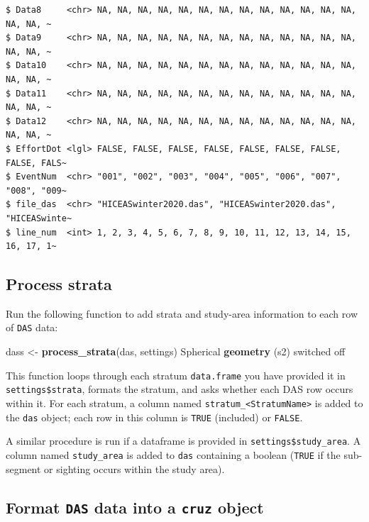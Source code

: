 \documentclass[
]{book}
\newenvironment{Shaded}{\begin{snugshade}}{\end{snugshade}}
\newcommand{\KeywordTok}[1]{\textcolor[rgb]{0.13,0.29,0.53}{\textbf{#1}}}
\newcommand{\NormalTok}[1]{#1}
\newcommand{\StringTok}[1]{\textcolor[rgb]{0.31,0.60,0.02}{#1}}
\begin{document}
\begin{verbatim}
$ Data8     <chr> NA, NA, NA, NA, NA, NA, NA, NA, NA, NA, NA, NA, NA, NA, NA, ~
$ Data9     <chr> NA, NA, NA, NA, NA, NA, NA, NA, NA, NA, NA, NA, NA, NA, NA, ~
$ Data10    <chr> NA, NA, NA, NA, NA, NA, NA, NA, NA, NA, NA, NA, NA, NA, NA, ~
$ Data11    <chr> NA, NA, NA, NA, NA, NA, NA, NA, NA, NA, NA, NA, NA, NA, NA, ~
$ Data12    <chr> NA, NA, NA, NA, NA, NA, NA, NA, NA, NA, NA, NA, NA, NA, NA, ~
$ EffortDot <lgl> FALSE, FALSE, FALSE, FALSE, FALSE, FALSE, FALSE, FALSE, FALS~
$ EventNum  <chr> "001", "002", "003", "004", "005", "006", "007", "008", "009~
$ file_das  <chr> "HICEASwinter2020.das", "HICEASwinter2020.das", "HICEASwinte~
$ line_num  <int> 1, 2, 3, 4, 5, 6, 7, 8, 9, 10, 11, 12, 13, 14, 15, 16, 17, 1~
\end{verbatim}

\hypertarget{process-strata}{%
\subsection*{Process strata}\label{process-strata}}

Run the following function to add strata and study-area information to each row of \texttt{DAS} data:

\begin{Shaded}
\begin{Highlighting}[]
\NormalTok{dass <-}\StringTok{ }\KeywordTok{process_strata}\NormalTok{(das, settings)}
\NormalTok{Spherical }\KeywordTok{geometry}\NormalTok{ (s2) switched off}
\end{Highlighting}
\end{Shaded}

This function loops through each stratum \texttt{data.frame} you have provided it in \texttt{settings\$strata}, formats the stratum, and asks whether each DAS row occurs within it. For each stratum, a column named \texttt{stratum\_\textless{}StratumName\textgreater{}} is added to the \texttt{das} object; each row in this column is \texttt{TRUE} (included) or \texttt{FALSE}.

A similar procedure is run if a dataframe is provided in \texttt{settings\$study\_area}. A column named \texttt{study\_area} is added to \texttt{das} containing a boolean (\texttt{TRUE} if the sub-segment or sighting occurs within the study area).

\hypertarget{format-das-data-into-a-cruz-object}{%
\subsection*{\texorpdfstring{Format \texttt{DAS} data into a \texttt{cruz} object}{Format DAS data into a cruz object}}\label{format-das-data-into-a-cruz-object}}
\end{document}
